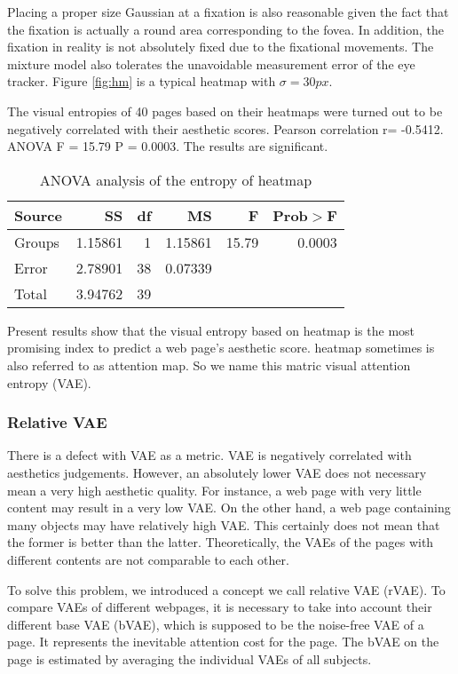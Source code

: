 Placing a proper size Gaussian at a fixation is also reasonable given the fact that the fixation is actually a round area corresponding to the fovea. In addition, the fixation in reality is not absolutely fixed due to the fixational movements\cite{Martinez2004}. The mixture model also tolerates the unavoidable measurement error of the eye tracker. Figure \ref{fig:hm} is a typical heatmap with $\sigma=30px$.

The visual entropies of 40 pages based on their heatmaps were turned out to be negatively correlated with their aesthetic scores. Pearson correlation r= -0.5412. ANOVA F = 15.79 P = 0.0003. The results are significant.

\begin{table}[H]
\begin{tabular}{lrrrrr}
  Source&SS&df&MS&F&Prob$>$F\\ \hline
  Groups&1.15861&1&1.15861&15.79&0.0003\\
  Error&2.78901&38&0.07339&&\\
  Total&3.94762&39&&&\\
\end{tabular}
\caption{ANOVA analysis of the entropy of heatmap}
\label{tab:ANOVA-vae-dw}
\end{table}

Present results show that the visual entropy based on heatmap is the most promising index to predict a web page's aesthetic score. heatmap sometimes is also referred to as attention map. So we name this matric visual attention entropy (VAE).

\subsubsection{Relative VAE}
There is a defect with VAE as a metric. VAE is negatively correlated with aesthetics judgements. However, an absolutely lower VAE does not necessary mean a very high aesthetic quality. For instance, a web page with very little content may result in a very low VAE. On the other hand, a web page containing many objects may have relatively high VAE. This certainly does not mean that the former is better than the latter. Theoretically, the VAEs of the pages with different contents are not comparable to each other.

To solve this problem, we introduced a concept we call relative VAE (rVAE). To compare VAEs of different webpages, it is necessary to take into account their different base VAE (bVAE), which is supposed to be the noise-free VAE of a page. It represents the inevitable attention cost for the page. The bVAE on the page is estimated by averaging the individual VAEs of all subjects.


